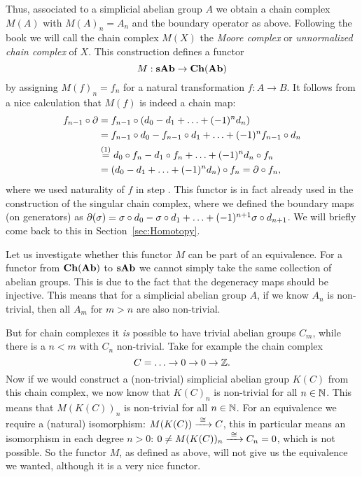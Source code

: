 Thus, associated to a simplicial abelian group $A$ we obtain a chain complex $M(A)$ with $M(A)_n = A_n$ and the boundary operator as above. Following the book \cite{goerss} we will call the chain complex $M(X)$ the \emph{Moore complex} or \emph{unnormalized chain complex} of $X$. This construction defines a functor
$$ M: \mathbf{sAb} \to \mathbf{Ch}(\mathbf{Ab}) $$
by assigning $M(f)_n = f_n$ for a natural transformation $f: A \to B$. It follows from a nice calculation that $M(f)$ is indeed a chain map:
\begin{align*}
	f_{n-1} \circ \partial &= f_{n-1} \circ (d_0 - d_1 + \ldots + (-1)^n d_n) \\
		&= f_{n-1} \circ d_0 - f_{n-1} \circ d_1 + \ldots + (-1)^n f_{n-1} \circ d_n \\
		&\stackrel{(1)}{=} d_0 \circ f_n - d_1 \circ f_n + \ldots + (-1)^n d_n \circ f_n \\
		&= (d_0 - d_1 + \ldots + (-1)^n d_n) \circ f_n = \partial \circ f_n,
\end{align*}
where we used naturality of $f$ in step . This functor is in fact already used in the construction of the singular chain complex, where we defined the boundary maps (on generators) as $\partial(\sigma) = \sigma \circ d_0 - \sigma \circ d_1 + \ldots + (-1)^{n+1} \sigma \circ d_{n+1}$. We will briefly come back to this in Section~\ref{sec:Homotopy}.

Let us investigate whether this functor $M$ can be part of an equivalence. For a functor from $\mathbf{Ch}(\mathbf{Ab})$ to $\mathbf{sAb}$ we cannot simply take the same collection of abelian groups. This is due to the fact that the degeneracy maps should be injective. This means that for a simplicial abelian group $A$, if we know $A_n$ is non-trivial, then all $A_m$ for $m > n$ are also non-trivial.

But for chain complexes it \emph{is} possible to have trivial abelian groups $C_m$, while there is a $n < m$ with $C_n$ non-trivial. Take for example the chain complex
$$ C = \ldots \to 0 \to 0 \to \mathbb{Z}. $$
Now if we would construct a (non-trivial) simplicial abelian group $K(C)$ from this chain complex, we now know that $K(C)_n$ is non-trivial for all $n \in \mathbb{N}$. This means that $M(K(C))_n$ is non-trivial for all $n \in \mathbb{N}$. For an equivalence we require a (natural) isomorphism: $M(K(C)) \xrightarrow{\,\,{\cong}\,\,} C$, this in particular means an isomorphism in each degree $n > 0$: $ 0 \neq M(K(C))_n \xrightarrow{\,\,{\cong}\,\,} C_n = 0 $, which is not possible. So the functor $M$, as defined as above, will not give us the equivalence we wanted, although it is a very nice functor.

